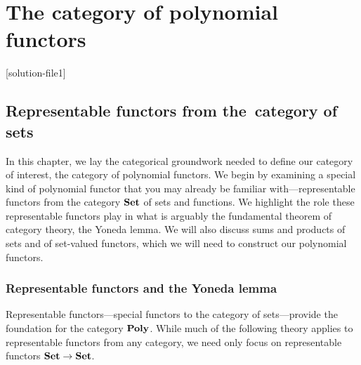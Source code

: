 \documentclass[Book-Poly]{subfiles}
\begin{document}
\setcounter{chapter}{0}%

\part{The category of polynomial functors}\label{part.poly}

[solution-file1]

\chapter{Representable functors from the~category of sets} \label{ch.poly.rep-sets}

In this chapter, we lay the categorical groundwork needed to define our category of interest, the category of polynomial functors.
We begin by examining a special kind of polynomial functor that you may already be familiar with---representable functors from the category $\mathbf{Set}$ of sets and functions.%
We highlight the role these representable functors play in what is arguably the fundamental theorem of category theory, the Yoneda lemma.
We will also discuss sums and products of sets and of set-valued functors, which we will need to construct our polynomial functors.

\section{Representable functors and the Yoneda lemma} \label{sec.poly.rep-sets.yon}


Representable functors---special functors to the category of sets---provide the foundation for the category $\mathbf{Poly}$.
While much of the following theory applies to representable functors from any category, we need only focus on representable functors $\mathbf{Set}\to\mathbf{Set}$.
\end{document}
